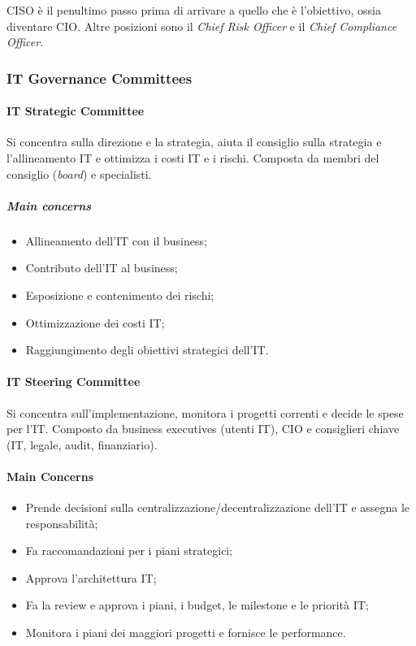 CISO è il penultimo passo prima di arrivare a quello che è l'obiettivo, ossia 
diventare CIO. Altre posizioni sono il \textit{Chief Risk Officer} e il 
\textit{Chief Compliance Officer}.

\subsubsection{IT Governance Committees}

\paragraph{IT Strategic Committee}

Si concentra sulla direzione e la strategia, aiuta il consiglio sulla strategia 
e l'allineamento IT e ottimizza i costi IT e i rischi. Composta da membri del 
consiglio (\textit{board}) e specialisti.

\subparagraph*{Main concerns}

\begin{itemize}
\item Allineamento dell'IT con il business;
\item Contributo dell'IT al business;
\item Esposizione e contenimento dei rischi;
\item Ottimizzazione dei costi IT;
\item Raggiungimento degli obiettivi strategici dell'IT.
\end{itemize}

\paragraph{IT Steering Committee}

Si concentra sull'implementazione, monitora i progetti correnti e decide le 
spese per l'IT. Composto da business executives (utenti IT), CIO e consiglieri 
chiave (IT, legale, audit, finanziario).

\paragraph*{Main Concerns}

\begin{itemize}
\item Prende decisioni sulla centralizzazione/decentralizzazione dell'IT e
assegna le responsabilità;
\item Fa raccomandazioni per i piani strategici;
\item Approva l'architettura IT;
\item Fa la review e approva i piani, i budget, le milestone e le priorità IT;
\item Monitora i piani dei maggiori progetti e fornisce le performance.
\end{itemize}

